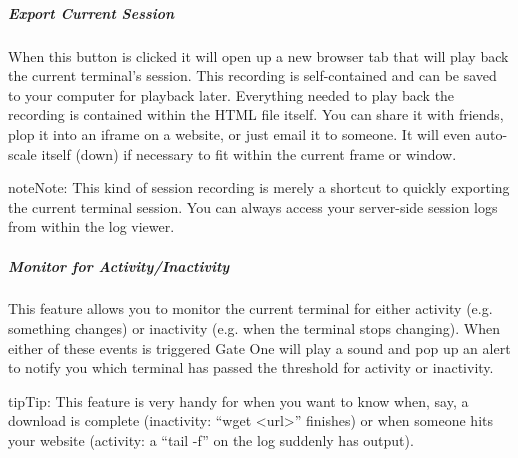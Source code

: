 \documentclass[letterpaper,10pt,openany]{sphinxmanual}
\begin{document}
\subparagraph{Export Current Session}
\label{Applications/terminal/userguide:export-current-session}
When this button is clicked it will open up a new browser tab that will play back the current terminal's session.  This recording is self-contained and can be saved to your computer for playback later.  Everything needed to play back the recording is contained within the HTML file itself.  You can share it with friends, plop it into an iframe on a website, or just email it to someone.  It will even auto-scale itself (down) if necessary to fit within the current frame or window.

\begin{notice}{note}{Note:}
This kind of session recording is merely a shortcut to quickly exporting the current terminal session.  You can always access your server-side session logs from within the log viewer.
\end{notice}


\subparagraph{Monitor for Activity/Inactivity}
\label{Applications/terminal/userguide:monitor-for-activity-inactivity}
This feature allows you to monitor the current terminal for either activity (e.g. something changes) or inactivity (e.g. when the terminal stops changing).  When either of these events is triggered Gate One will play a sound and pop up an alert to notify you which terminal has passed the threshold for activity or inactivity.

\begin{notice}{tip}{Tip:}
This feature is very handy for when you want to know when, say, a download is complete (inactivity: ``wget \textless{}url\textgreater{}'' finishes) or when someone hits your website (activity: a ``tail -f'' on the log suddenly has output).
\end{notice}
\end{document}
